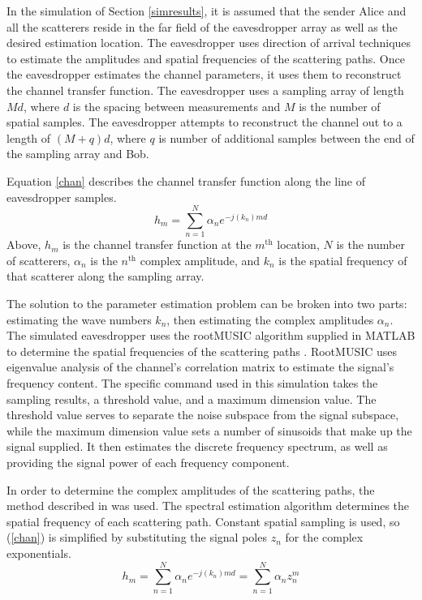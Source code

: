 \documentclass{allertonproc}
\begin{document}
In the simulation of Section \ref{simresults}, it is assumed that the sender Alice and all the scatterers reside in the far field of the eavesdropper array as well as the desired estimation location. The eavesdropper uses direction of arrival techniques to estimate the amplitudes and spatial frequencies of the scattering paths. Once the eavesdropper estimates the channel parameters, it uses them to reconstruct the channel transfer function. The eavesdropper uses a sampling array of length $Md$, where $d$ is the spacing between measurements and $M$ is the number of spatial samples. The eavesdropper attempts to reconstruct the channel out to a length of $(M+q)d$, where $q$ is number of additional samples between the end of the sampling array and Bob. 

Equation \ref{chan} describes the channel transfer function along the line of eavesdropper samples.
\begin{equation}\label{chan}
h_m= \sum_{n=1}^N \alpha_n e^{-j(k_n)md}
\end{equation}
Above, $h_m$ is the channel transfer function at the $m^{\mathrm{th}}$ location, $N$ is the number of scatterers, $\alpha_n$ is the $n^{\mathrm{th}}$ complex amplitude, and $k_n$ is the spatial frequency of that scatterer along the sampling array.  

The solution to the parameter estimation problem can be broken into two parts: estimating the wave numbers $k_n$, then estimating the complex amplitudes $\alpha_n$. The simulated eavesdropper uses the rootMUSIC algorithm supplied in MATLAB to determine the spatial frequencies of the scattering paths \cite{matlab}. RootMUSIC uses eigenvalue analysis of the channel's correlation matrix to estimate the signal's frequency content. The specific command used in this simulation takes the sampling results, a threshold value, and a maximum dimension value. The threshold value serves to separate the noise subspace from the signal subspace, while the maximum dimension value sets a number of sinusoids that make up the signal supplied. It then estimates the discrete frequency spectrum, as well as providing the signal power of each frequency component. 

In order to determine the complex amplitudes of the scattering paths, the method described in \cite{andersen1999} was used. The spectral estimation algorithm determines the spatial frequency of each scattering path. Constant spatial sampling is used, so (\ref{chan}) is simplified by substituting the signal poles $z_n$ for the complex exponentials.
\begin{equation}\label{complexamp}
h_m = \sum_{n=1}^N \alpha_n e^{-j(k_n)md} = \sum_{n=1}^N \alpha_n z_n^m
\end{equation}
\end{document}
